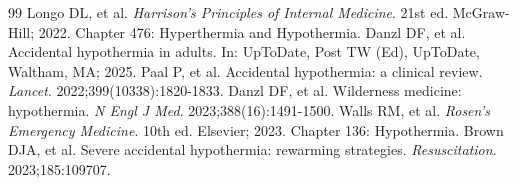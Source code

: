 \begin{thebibliography}{99}
 Longo DL, et al. \emph{Harrison's Principles of Internal Medicine}. 21st ed. McGraw-Hill; 2022. Chapter 476: Hyperthermia and Hypothermia.
 Danzl DF, et al. Accidental hypothermia in adults. In: UpToDate, Post TW (Ed), UpToDate, Waltham, MA; 2025.
 Paal P, et al. Accidental hypothermia: a clinical review. \emph{Lancet}. 2022;399(10338):1820-1833.
 Danzl DF, et al. Wilderness medicine: hypothermia. \emph{N Engl J Med}. 2023;388(16):1491-1500.
 Walls RM, et al. \emph{Rosen's Emergency Medicine}. 10th ed. Elsevier; 2023. Chapter 136: Hypothermia.
 Brown DJA, et al. Severe accidental hypothermia: rewarming strategies. \emph{Resuscitation}. 2023;185:109707.
\end{thebibliography}
